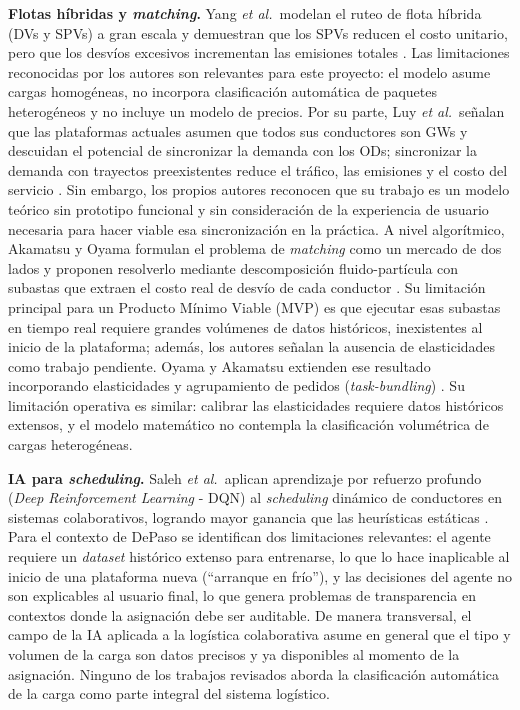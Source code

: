 \textbf{Flotas híbridas y \emph{matching}.} Yang \textit{et al.}\ modelan el ruteo de flota híbrida (DVs y SPVs) a gran escala y demuestran que los SPVs reducen el costo unitario, pero que los desvíos excesivos incrementan las emisiones totales \parencite{YangEtAl2022}. Las limitaciones reconocidas por los autores son relevantes para este proyecto: el modelo asume cargas homogéneas, no incorpora clasificación automática de paquetes heterogéneos y no incluye un modelo de precios. Por su parte, Luy \textit{et al.}\ señalan que las plataformas actuales asumen que todos sus conductores son GWs y descuidan el potencial de sincronizar la demanda con los ODs; sincronizar la demanda con trayectos preexistentes reduce el tráfico, las emisiones y el costo del servicio \parencite{LuyEtAl2023}. Sin embargo, los propios autores reconocen que su trabajo es un modelo teórico sin prototipo funcional y sin consideración de la experiencia de usuario necesaria para hacer viable esa sincronización en la práctica. A nivel algorítmico, Akamatsu y Oyama formulan el problema de \emph{matching} como un mercado de dos lados y proponen resolverlo mediante descomposición fluido-partícula con subastas que extraen el costo real de desvío de cada conductor \parencite{AkamatsuOyama2023}. Su limitación principal para un Producto Mínimo Viable (MVP) es que ejecutar esas subastas en tiempo real requiere grandes volúmenes de datos históricos, inexistentes al inicio de la plataforma; además, los autores señalan la ausencia de elasticidades como trabajo pendiente. Oyama y Akamatsu extienden ese resultado incorporando elasticidades y agrupamiento de pedidos (\emph{task-bundling}) \parencite{OyamaAkamatsu2024}. Su limitación operativa es similar: calibrar las elasticidades requiere datos históricos extensos, y el modelo matemático no contempla la clasificación volumétrica de cargas heterogéneas.

\textbf{IA para \emph{scheduling}.} Saleh \textit{et al.}\ aplican aprendizaje por refuerzo profundo (\emph{Deep Reinforcement Learning} - DQN) al \emph{scheduling} dinámico de conductores en sistemas colaborativos, logrando mayor ganancia que las heurísticas estáticas \parencite{SalehEtAl2024}. Para el contexto de DePaso se identifican dos limitaciones relevantes: el agente requiere un \emph{dataset} histórico extenso para entrenarse, lo que lo hace inaplicable al inicio de una plataforma nueva (``arranque en frío''), y las decisiones del agente no son explicables al usuario final, lo que genera problemas de transparencia en contextos donde la asignación debe ser auditable. De manera transversal, el campo de la IA aplicada a la logística colaborativa asume en general que el tipo y volumen de la carga son datos precisos y ya disponibles al momento de la asignación. Ninguno de los trabajos revisados aborda la clasificación automática de la carga como parte integral del sistema logístico.

